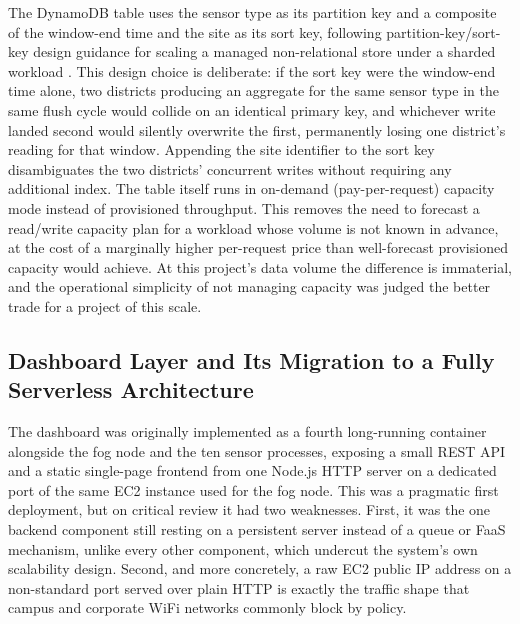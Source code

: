 \documentclass[conference]{IEEEtran}
\begin{document}
The DynamoDB table uses the sensor type as its partition key and a composite of the window-end time and the site as its sort key, following partition-key/sort-key design guidance for scaling a managed non-relational store under a sharded workload \cite{ref14}. This design choice is deliberate: if the sort key were the window-end time alone, two districts producing an aggregate for the same sensor type in the same flush cycle would collide on an identical primary key, and whichever write landed second would silently overwrite the first, permanently losing one district's reading for that window. Appending the site identifier to the sort key disambiguates the two districts' concurrent writes without requiring any additional index. The table itself runs in on-demand (pay-per-request) capacity mode instead of provisioned throughput. This removes the need to forecast a read/write capacity plan for a workload whose volume is not known in advance, at the cost of a marginally higher per-request price than well-forecast provisioned capacity would achieve. At this project's data volume the difference is immaterial, and the operational simplicity of not managing capacity was judged the better trade for a project of this scale.

\subsection{Dashboard Layer and Its Migration to a Fully Serverless Architecture}
The dashboard was originally implemented as a fourth long-running container alongside the fog node and the ten sensor processes, exposing a small REST API and a static single-page frontend from one Node.js HTTP server on a dedicated port of the same EC2 instance used for the fog node. This was a pragmatic first deployment, but on critical review it had two weaknesses. First, it was the one backend component still resting on a persistent server instead of a queue or FaaS mechanism, unlike every other component, which undercut the system's own scalability design. Second, and more concretely, a raw EC2 public IP address on a non-standard port served over plain HTTP is exactly the traffic shape that campus and corporate WiFi networks commonly block by policy.
\end{document}
